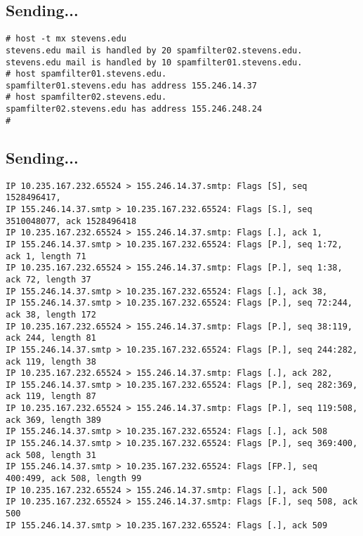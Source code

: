 \documentclass[xga]{xdvislides}
\begin{document}
\subsection{Sending...}
\begin{verbatim}
# host -t mx stevens.edu
stevens.edu mail is handled by 20 spamfilter02.stevens.edu.
stevens.edu mail is handled by 10 spamfilter01.stevens.edu.
# host spamfilter01.stevens.edu.
spamfilter01.stevens.edu has address 155.246.14.37
# host spamfilter02.stevens.edu.
spamfilter02.stevens.edu has address 155.246.248.24
#
\end{verbatim}

\subsection{Sending...}
\smallish
\begin{verbatim}
IP 10.235.167.232.65524 > 155.246.14.37.smtp: Flags [S], seq 1528496417,
IP 155.246.14.37.smtp > 10.235.167.232.65524: Flags [S.], seq 3510048077, ack 1528496418
IP 10.235.167.232.65524 > 155.246.14.37.smtp: Flags [.], ack 1, 
IP 155.246.14.37.smtp > 10.235.167.232.65524: Flags [P.], seq 1:72, ack 1, length 71
IP 10.235.167.232.65524 > 155.246.14.37.smtp: Flags [P.], seq 1:38, ack 72, length 37
IP 155.246.14.37.smtp > 10.235.167.232.65524: Flags [.], ack 38, 
IP 155.246.14.37.smtp > 10.235.167.232.65524: Flags [P.], seq 72:244, ack 38, length 172
IP 10.235.167.232.65524 > 155.246.14.37.smtp: Flags [P.], seq 38:119, ack 244, length 81
IP 155.246.14.37.smtp > 10.235.167.232.65524: Flags [P.], seq 244:282, ack 119, length 38
IP 10.235.167.232.65524 > 155.246.14.37.smtp: Flags [.], ack 282,
IP 155.246.14.37.smtp > 10.235.167.232.65524: Flags [P.], seq 282:369, ack 119, length 87
IP 10.235.167.232.65524 > 155.246.14.37.smtp: Flags [P.], seq 119:508, ack 369, length 389
IP 155.246.14.37.smtp > 10.235.167.232.65524: Flags [.], ack 508
IP 155.246.14.37.smtp > 10.235.167.232.65524: Flags [P.], seq 369:400, ack 508, length 31
IP 155.246.14.37.smtp > 10.235.167.232.65524: Flags [FP.], seq 400:499, ack 508, length 99
IP 10.235.167.232.65524 > 155.246.14.37.smtp: Flags [.], ack 500
IP 10.235.167.232.65524 > 155.246.14.37.smtp: Flags [F.], seq 508, ack 500
IP 155.246.14.37.smtp > 10.235.167.232.65524: Flags [.], ack 509
\end{verbatim}
\Normalsize
\end{document}
